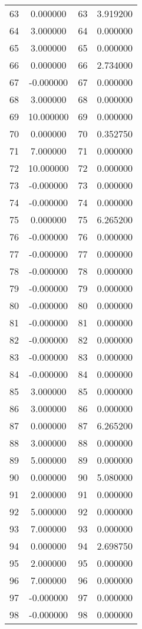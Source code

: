 \documentclass[12pt]{article}
\begin{document}
\begin{longtable}{@{}cccc@{}}
63 & 0.000000 & 63 & 3.919200 \\
64 & 3.000000 & 64 & 0.000000 \\
65 & 3.000000 & 65 & 0.000000 \\
66 & 0.000000 & 66 & 2.734000 \\
67 & -0.000000 & 67 & 0.000000 \\
68 & 3.000000 & 68 & 0.000000 \\
69 & 10.000000 & 69 & 0.000000 \\
70 & 0.000000 & 70 & 0.352750 \\
71 & 7.000000 & 71 & 0.000000 \\
72 & 10.000000 & 72 & 0.000000 \\
73 & -0.000000 & 73 & 0.000000 \\
74 & -0.000000 & 74 & 0.000000 \\
75 & 0.000000 & 75 & 6.265200 \\
76 & -0.000000 & 76 & 0.000000 \\
77 & -0.000000 & 77 & 0.000000 \\
78 & -0.000000 & 78 & 0.000000 \\
79 & -0.000000 & 79 & 0.000000 \\
80 & -0.000000 & 80 & 0.000000 \\
81 & -0.000000 & 81 & 0.000000 \\
82 & -0.000000 & 82 & 0.000000 \\
83 & -0.000000 & 83 & 0.000000 \\
84 & -0.000000 & 84 & 0.000000 \\
85 & 3.000000 & 85 & 0.000000 \\
86 & 3.000000 & 86 & 0.000000 \\
87 & 0.000000 & 87 & 6.265200 \\
88 & 3.000000 & 88 & 0.000000 \\
89 & 5.000000 & 89 & 0.000000 \\
90 & 0.000000 & 90 & 5.080000 \\
91 & 2.000000 & 91 & 0.000000 \\
92 & 5.000000 & 92 & 0.000000 \\
93 & 7.000000 & 93 & 0.000000 \\
94 & 0.000000 & 94 & 2.698750 \\
95 & 2.000000 & 95 & 0.000000 \\
96 & 7.000000 & 96 & 0.000000 \\
97 & -0.000000 & 97 & 0.000000 \\
98 & -0.000000 & 98 & 0.000000 \\

\end{longtable}
\end{document}
